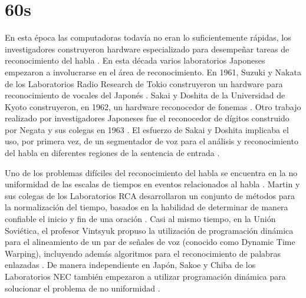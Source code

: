 \section{60s}
\label{sec:60s}

En esta \'{e}poca las computadoras todav\'{i}a no eran lo suficientemente r\'{a}pidas, los investigadores
construyeron hardware especializado para desempe\~{n}ar tareas de reconocimiento del habla \cite{Furui50Years2004}.
En esta d\'{e}cada varios laboratorios Japoneses empezaron a involucrarse en el \'{a}rea de reconocimiento. En 1961,
Suzuki y Nakata de los Laboratorios Radio Research de Tokio construyeron un hardware para reconocimiento de vocales
del Japon\'{e}s \cite{SuzukiRecognition1961}. Sakai y Doshita de la Universidad de Kyoto construyeron, en 1962, un
hardware reconocedor de fonemas \cite{SakaiThePhonetic1962}. Otro trabajo realizado por investigadores Japoneses fue
el reconocedor de d\'{i}gitos construido por Negata y sus colegas en 1963 \cite{NagataSpoken1963}. El esfuerzo de
Sakai y Doshita implicaba el uso, por primera vez, de un segmentador de voz para el an\'{a}lisis y reconocimiento
del habla en diferentes regiones de la sentencia de entrada \cite{JaisalAReview2012}.

Uno de los problemas dif\'{i}ciles del reconocimiento del habla se encuentra en la no uniformidad de las escalas de
tiempos en eventos relacionados al habla \cite{Furui50Years2004}. Martin y sus colegas de los Laboratorios RCA
desarrollaron un conjunto de m\'{e}todos para la normalizaci\'{o}n del tiempo, basados en la habilidad de determinar
de manera confiable el inicio y fin de una oraci\'{o}n \cite{MartinSpeech1964}. Casi al mismo tiempo, en la Uni\'{o}n
Sovi\'{e}tica, el profesor Vintsyuk propuso la utilizaci\'{o}n de programaci\'{o}n din\'{a}mica para el alineamiento de un par
de se\~{n}ales de voz (conocido como Dynamic Time Warping), incluyendo adem\'{a}s algoritmos para el 
reconocimiento de palabras enlazadas \cite{VintsyukSpeech1968}. De manera independiente en Jap\'{o}n, Sakoe y Chiba de los
Laboratorios NEC tambi\'{e}n empezaron a utilizar programaci\'{o}n din\'{a}mica para solucionar el problema de no uniformidad
\cite{SakoeDynamic1978}.
